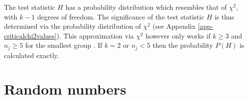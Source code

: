 \documentclass[
]{book}
\begin{document}
The test statistic \(H\) has a probability distribution which resembles that of
\(\chi^2\), with \(k-1\) degrees of freedom. The significance of the
test statistic \(H\) is thus determined via the probability distribution of
\(\chi^2\) (see Appendix \ref{app-criticalchi2values}).
This approximation via \(\chi^2\) however only works if \(k\ge3\)
and \(n_j\ge5\) for the smallest group \citep{Ferg89}.
If \(k=2\) or \(n_j<5\) then the probability \(P(H)\) is calculated exactly.

\appendix


\chapter{Random numbers}\label{app-randomnumbers}

\begin{table}


\end{table}
\end{document}
